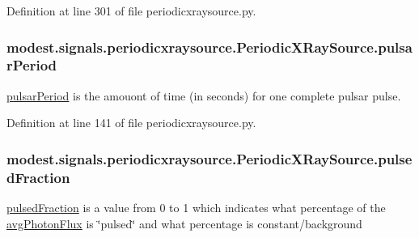 Definition at line 301 of file periodicxraysource.\+py.

\subsubsection[{\texorpdfstring{pulsar\+Period}{pulsarPeriod}}]{\setlength{\rightskip}{0pt plus 5cm}modest.\+signals.\+periodicxraysource.\+Periodic\+X\+Ray\+Source.\+pulsar\+Period}\hypertarget{classmodest_1_1signals_1_1periodicxraysource_1_1PeriodicXRaySource_a85fd954a8c19067087bbcb41a43a9f75}{}\label{classmodest_1_1signals_1_1periodicxraysource_1_1PeriodicXRaySource_a85fd954a8c19067087bbcb41a43a9f75}


\hyperlink{classmodest_1_1signals_1_1periodicxraysource_1_1PeriodicXRaySource_a85fd954a8c19067087bbcb41a43a9f75}{pulsar\+Period} is the amouont of time (in seconds) for one complete pulsar pulse. 



Definition at line 141 of file periodicxraysource.\+py.

\subsubsection[{\texorpdfstring{pulsed\+Fraction}{pulsedFraction}}]{\setlength{\rightskip}{0pt plus 5cm}modest.\+signals.\+periodicxraysource.\+Periodic\+X\+Ray\+Source.\+pulsed\+Fraction}\hypertarget{classmodest_1_1signals_1_1periodicxraysource_1_1PeriodicXRaySource_af76a5783d522dde15f37a9c48aa04391}{}\label{classmodest_1_1signals_1_1periodicxraysource_1_1PeriodicXRaySource_af76a5783d522dde15f37a9c48aa04391}


\hyperlink{classmodest_1_1signals_1_1periodicxraysource_1_1PeriodicXRaySource_af76a5783d522dde15f37a9c48aa04391}{pulsed\+Fraction} is a value from 0 to 1 which indicates what percentage of the \hyperlink{classmodest_1_1signals_1_1periodicxraysource_1_1PeriodicXRaySource_ab18463cedaf7e9ea17447e46f341bbb0}{avg\+Photon\+Flux} is \char`\"{}pulsed\char`\"{} and what percentage is constant/background 



